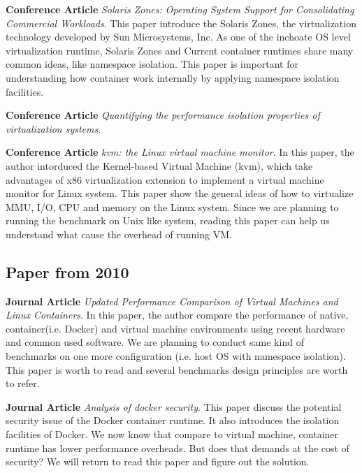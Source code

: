\documentclass{article}
\begin{document}
\medskip

\textbf{Conference Article} \emph{Solaris Zones: Operating System Support for Consolidating 
Commercial Workloads}\cite{price2004solaris}. This paper introduce the Solaris Zones, the 
virtualization technology developed by Sun Microsystems, Inc. As one of the inchoate OS 
level virtualization runtime, Solaris Zones and Current container runtimes share many common 
ideas, like namespace isolation. This paper is important for understanding how container 
work internally by applying namespace isolation facilities.

\medskip

\textbf{Conference Article} \emph{Quantifying the performance isolation properties of virtualization 
systems}\cite{matthews2007quantifying}.

\medskip

\textbf{Conference Article} \emph{kvm: the Linux virtual machine monitor}\cite{kivity2007kvm}. 
In this paper, the author intorduced the Kernel-based Virtual Machine (kvm), which take advantages of
x86 virtualization extension to implement a virtual machine monitor for Linux system. This 
paper show the general ideas of how to virtualize MMU, I/O, CPU and memory on the Linux system.
Since we are planning to running the benchmark on Unix like system, reading this paper can help us 
understand what cause the overhead of running VM.

\subsection{Paper from 2010}

\textbf{Journal Article} \emph{Updated Performance Comparison of Virtual Machines and Linux 
Containers}\cite{felter2014updated}. In this paper, the author compare the performance of 
native, container(i.e. Docker) and virtual machine environments using recent hardware and common 
used software. We are planning to conduct same kind of benchmarks on one more configuration
(i.e. host OS with namespace isolation). This paper is worth to read and several benchmarks 
design principles are worth to refer.

\medskip

\textbf{Journal Article} \emph{Analysis of docker security}\cite{bui2015analysis}. This paper 
discuss the potential security issue of the Docker container runtime. It also introduces the 
isolation facilities of Docker. We now know that compare to virtual machine, container runtime 
has lower performance overheads. But does that demands at the cost of security? We will return to
read this paper and figure out the solution. 
\end{document}
